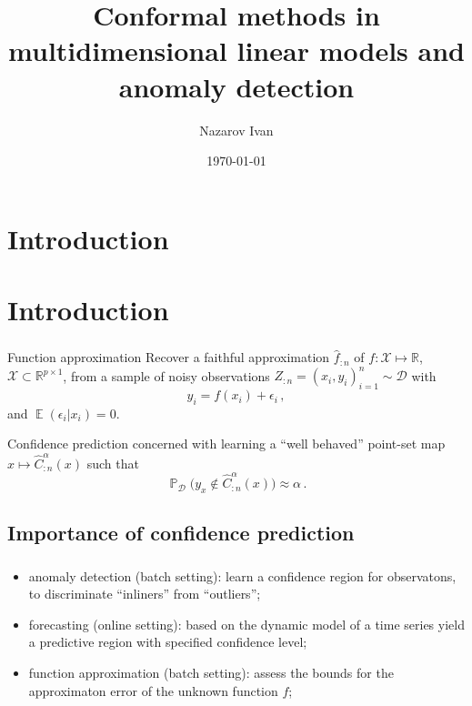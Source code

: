 \documentclass[t]{beamer}  %
\title{Conformal methods in multidimensional linear models and anomaly detection}
\author[Nazarov Ivan]{Nazarov Ivan}
\date{\today}
\institute[Higher School of Economics]{National Research University \\ Higher School of Economics}
\newcommand{\Dcal}{\mathcal{D}}
\newcommand{\Xcal}{\mathcal{X}}
\newcommand{\Real}{\mathbb{R}}
\newcommand{\ex}{\mathop{\mathbb{E}}\nolimits}
\newcommand{\pr}{\mathop{\mathbb{P}}\nolimits}
\begin{document}
\frame[plain]{\titlepage} %

\section{Introduction} %
\label{sec:introduction}





\section{Introduction} %
\label{sec:introduction}

\begin{frame}[c]\frametitle{\insertsection}
  \begin{block}{Function approximation}
    Recover a faithful approximation $\hat{f}_{:n}$ of $f:\Xcal \mapsto \Real$, $\Xcal\subset \Real^{p\times 1}$,
    from a sample of noisy observations $Z_{:n} = (x_i, y_i)_{i=1}^n \sim \Dcal$ with
    $$ y_i = f(x_i) + \epsilon_i \,, $$
    and $\ex(\epsilon_i|x_i) = 0$.
  \end{block}

  \begin{block}{Confidence prediction}
    concerned with learning a ``well behaved'' point-set map $x \mapsto \hat{C}_{:n}^\alpha(x)$
    such that
    $$ \pr_\Dcal\bigl(y_x \notin \hat{C}_{:n}^\alpha(x)\bigr) \approx \alpha \,. $$
  \end{block}
\end{frame}

\subsection{Importance of confidence prediction} %
\label{sub:importance_of_cp}

\begin{frame}[c]\frametitle{\insertsection}
  \framesubtitle{\insertsubsection}
  \begin{itemize}
    \item anomaly detection (batch setting): learn a confidence region for observatons,
    to discriminate ``inliners'' from ``outliers'';
    \item forecasting (online setting): based on the dynamic model of a time series
    yield a predictive region with specified confidence level;
    \item function approximation (batch setting): assess the bounds for the approximaton
    error of the unknown function $f$;
  \end{itemize}
\end{frame}
\end{document}
